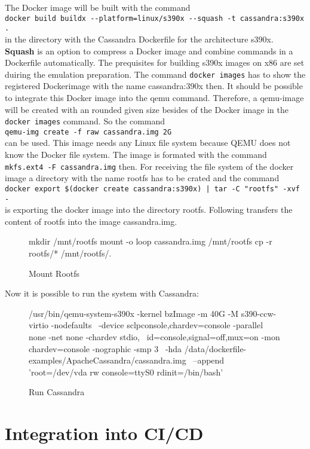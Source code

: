 The Docker image will be built with the command  \\
\lstinline!docker build buildx --platform=linux/s390x --squash -t cassandra:s390x .! \\
in the directory with the Cassandra Dockerfile  for the architecture s390x. \\
\textbf{Squash} is an option to compress a Docker image and combine commands in a Dockerfile automatically. The prequisites for building s390x images on x86 are set duiring the emulation preparation. The command \lstinline!docker images! has to show the registered Dockerimage with the name cassandra:390x then. It should be possible to integrate this Docker image into the qemu command. Therefore, a qemu-image will be created with an rounded given size besides of the Docker image in the  \lstinline!docker images! command. So the command \\  
\lstinline!qemu-img create -f raw cassandra.img 2G!  \\
can be used. This image needs any Linux file system because QEMU does not know the Docker file system. The image is formated with the command  \lstinline!mkfs.ext4 -F cassandra.img! then. For receiving the file system of the docker image a directory with the name rootfs has to be crated and the command \\
\lstinline!docker export $(docker create cassandra:s390x) | tar -C "rootfs" -xvf -!  \\ 
is exporting the docker image into the directory rootfs. Following transfers the content of rootfs into the image cassandra.img.

\begin{figure}[H]
\centering
\begin{boxedverbatim}
mkdir /mnt/rootfs
mount -o loop cassandra.img /mnt/rootfs
cp -r rootfs/* /mnt/rootfs/.
\end{boxedverbatim}
 \caption{Mount Rootfs}
    \label{Mount-Rootfs}
\end{figure}

Now it is possible to run the system with Cassandra: \\
\begin{figure}[H]
\centering
\begin{boxedverbatim}
 /usr/bin/qemu-system-s390x -kernel bzImage -m 40G -M s390-ccw-virtio -nodefaults \
 -device sclpconsole,chardev=console -parallel none -net none -chardev stdio, \
 id=console,signal=off,mux=on -mon chardev=console -nographic -smp 3 \
 -hda /data/dockerfile-examples/ApacheCassandra/cassandra.img \
 --append 'root=/dev/vda rw console=ttyS0 rdinit=/bin/bash' 
\end{boxedverbatim}
 \caption{Run Cassandra}
    \label{RunCassandra}
\end{figure}

\section{Integration into CI/CD}